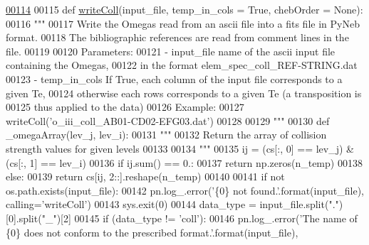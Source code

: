 \begin{DoxyCode}
\hypertarget{namespacepyneb_1_1utils_1_1fits_l00114}{}\hyperlink{namespacepyneb_1_1utils_1_1fits_a468ecdfaa21de61a1037128ee889fd76}{00114} 
00115 \textcolor{keyword}{def }\hyperlink{namespacepyneb_1_1utils_1_1fits_a468ecdfaa21de61a1037128ee889fd76}{writeColl}(input\_file, temp\_in\_cols = True, chebOrder = None):
00116     \textcolor{stringliteral}{""" }
00117 \textcolor{stringliteral}{    Write the Omegas read from an ascii file into a fits file in PyNeb format.}
00118 \textcolor{stringliteral}{    The bibliographic references are read from comment lines in the file.}
00119 \textcolor{stringliteral}{        }
00120 \textcolor{stringliteral}{    Parameters:}
00121 \textcolor{stringliteral}{        - input\_file    name of the ascii input file containing the Omegas,}
00122 \textcolor{stringliteral}{                        in the format elem\_spec\_coll\_REF-STRING.dat}
00123 \textcolor{stringliteral}{        - temp\_in\_cols  If True, each column of the input file corresponds to a given Te, }
00124 \textcolor{stringliteral}{                         otherwise each rows corresponds to a given Te (a transposition is }
00125 \textcolor{stringliteral}{                         thus applied to the data)}
00126 \textcolor{stringliteral}{    Example: }
00127 \textcolor{stringliteral}{    writeColl('o\_iii\_coll\_AB01-CD02-EFG03.dat')}
00128 \textcolor{stringliteral}{}
00129 \textcolor{stringliteral}{    """}
00130     \textcolor{keyword}{def }\_omegaArray(lev\_j, lev\_i):
00131         \textcolor{stringliteral}{"""}
00132 \textcolor{stringliteral}{        Return the array of collision strength values for given levels}
00133 \textcolor{stringliteral}{ }
00134 \textcolor{stringliteral}{        """}       
00135         ij = (cs[:, 0] == lev\_j) & (cs[:, 1] == lev\_i)
00136         \textcolor{keywordflow}{if} ij.sum() == 0.:
00137             \textcolor{keywordflow}{return} np.zeros(n\_temp)
00138         \textcolor{keywordflow}{else}:
00139             \textcolor{keywordflow}{return} cs[ij, 2::].reshape(n\_temp)
00140 
00141     \textcolor{keywordflow}{if} \textcolor{keywordflow}{not} os.path.exists(input\_file):
00142         pn.log\_.error(\textcolor{stringliteral}{'\{0\} not found.'}.format(input\_file), calling=\textcolor{stringliteral}{'writeColl'})
00143         sys.exit(0)
00144     data\_type = input\_file.split(\textcolor{stringliteral}{"."})[0].split(\textcolor{stringliteral}{"\_"})[2]
00145     \textcolor{keywordflow}{if} (data\_type != \textcolor{stringliteral}{'coll'}):
00146         pn.log\_.error(\textcolor{stringliteral}{'The name of \{0\} does not conform to the prescribed format.'}.format(input\_file), 

\end{DoxyCode}
